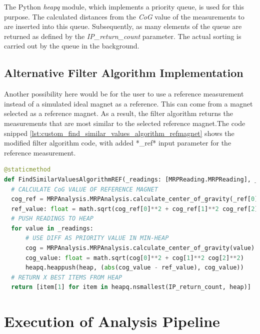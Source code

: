 The Python \emph{heapq} \cite{heapq} module, which implements a
priority queue, is used for this purpose. The calculated distances from
the \emph{CoG} value of the measurements to are inserted into this
queue. Subsequently, as many elements of the queue are returned as
defined by the \emph{IP\_return\_count} parameter. The actual sorting is
carried out by the queue in the background.

\hypertarget{alternative-filter-algorithm-implementation}{%
\subsection{Alternative Filter Algorithm
Implementation}\label{alternative-filter-algorithm-implementation}}

Another possibility here would be for the user to use a reference
measurement instead of a simulated ideal magnet as a reference. This can
come from a magnet selected as a reference magnet. As a result, the
filter algorithm returns the measurements that are most similar to the
selected reference magnet.The code snipped
\ref{lst:custom_find_similar_values_algorithm_refmagnet} shows the
modified filter algorithm code, with added *\_ref* input parameter for
the reference measurement.

\begin{lstlisting}[language=Python, caption={Modified user implemented custom find algorithm using a reference magnet reading}, label=lst:custom_find_similar_values_algorithm_refmagnet]
@staticmethod
def FindSimilarValuesAlgorithmREF(_readings: [MRPReading.MRPReading], _ref: [MRPReading.MRPReading], IP_return_count: int = 4) -> [MRPReading.MRPReading]:
  # CALCULATE CoG VALUE OF REFERENCE MAGNET
  cog_ref = MRPAnalysis.MRPAnalysis.calculate_center_of_gravity(_ref[0])
  ref_value: float = math.sqrt(cog_ref[0]**2 + cog_ref[1]**2 cog_ref[2]**2)
  # PUSH READINGS TO HEAP
  for value in _readings:
      # USE DIFF AS PRIORITY VALUE IN MIN-HEAP
      cog = MRPAnalysis.MRPAnalysis.calculate_center_of_gravity(value)
      cog_value: float = math.sqrt(cog[0]**2 + cog[1]**2 cog[2]**2)
      heapq.heappush(heap, (abs(cog_value - ref_value), cog_value))
  # RETURN X BEST ITEMS FROM HEAP
  return [item[1] for item in heapq.nsmallest(IP_return_count, heap)]
\end{lstlisting}

\hypertarget{execution-of-analysis-pipeline}{%
\section{Execution of Analysis
Pipeline}\label{execution-of-analysis-pipeline}}

